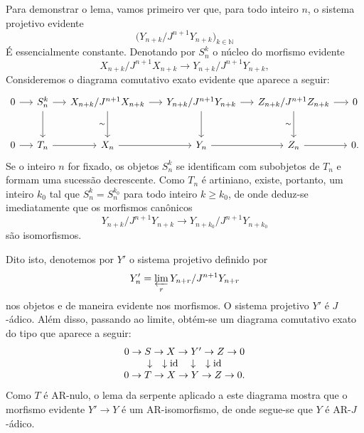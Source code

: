 \begin{prooftext}
Para demonstrar o lema, vamos primeiro ver que, para todo inteiro \(n\), o sistema projetivo evidente
\[
\bigl(Y_{n+k}/J^{n+1}Y_{n+k}\bigr)_{k\in\mathbb N}
\]
É essencialmente constante. Denotando por \(S_n^k\) o núcleo do morfismo evidente
\[
X_{n+k}/J^{n+1}X_{n+k}\longrightarrow
Y_{n+k}/J^{n+1}Y_{n+k},
\]
Consideremos o diagrama comutativo exato evidente que aparece a seguir:
\[
\begin{tikzcd}[column sep=1.35em,row sep=large]
0 \arrow[r] & S_n^k \arrow[r] \arrow[d] & X_{n+k}/J^{n+1}X_{n+k} \arrow[r] \arrow[d,"\sim"'] & Y_{n+k}/J^{n+1}Y_{n+k} \arrow[r] \arrow[d] & Z_{n+k}/J^{n+1}Z_{n+k} \arrow[r] \arrow[d,"\sim"'] & 0\\
0 \arrow[r] & T_n \arrow[r] & X_n \arrow[r] & Y_n \arrow[r] & Z_n \arrow[r] & 0 .
\end{tikzcd}
\]
Se o inteiro \(n\) for fixado, os objetos \(S_n^k\) se identificam com subobjetos de \(T_n\) e formam uma sucessão decrescente. Como \(T_n\) é artiniano, existe, portanto, um inteiro \(k_0\) tal que \(S_n^k=S_n^{k_0}\) para todo inteiro \(k\ge k_0\), de onde deduz-se imediatamente que os morfismos canônicos
\[
Y_{n+k}/J^{n+1}Y_{n+k}
\longrightarrow
Y_{n+k_0}/J^{n+1}Y_{n+k_0}
\]
são isomorfismos.

Dito isto, denotemos por \(Y'\) o sistema projetivo definido por
\[
Y'_n=\varprojlim_r Y_{n+r}/J^{n+1}Y_{n+r}
\]
nos objetos e de maneira evidente nos morfismos. O sistema projetivo \(Y'\) é \(J\)-ádico. Além disso, passando ao limite, obtém-se um diagrama comutativo exato do tipo que aparece a seguir:
\[
\begin{array}{ccccc}
0\to S\to X\to Y'\to Z\to0\\
\downarrow\quad\downarrow\operatorname{id}\quad\downarrow\quad\downarrow\operatorname{id}\\
0\to T\to X\to Y\to Z\to0 .
\end{array}
\]
Como \(T\) é AR-nulo, o lema da serpente aplicado a este diagrama mostra que o morfismo evidente \(Y'\to Y\) é um AR-isomorfismo, de onde segue-se que \(Y\) é AR-\(J\)-ádico.
\end{prooftext}
